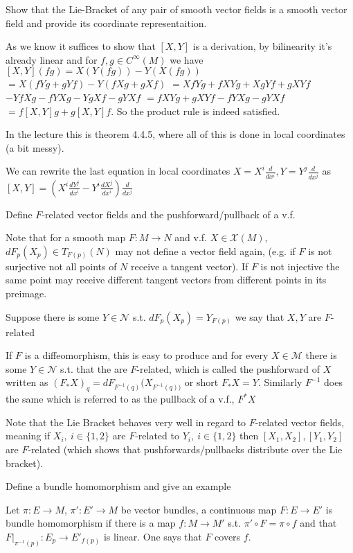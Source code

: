Show that the Lie-Bracket of any pair of smooth vector fields is a smooth vector
field and provide its coordinate representaition.


As we know it suffices to show that \( [X, Y] \) is a derivation, by bilinearity
it's already linear and for \( f, g \in C^\infty(M) \) we have 
\([X, Y](fg) = X (Y (fg)) - Y (X(fg))\)
\(=X(f Yg +gYf)-Y(fXg+gXf)\)
\(=Xf Yg + f XYg + XgYf+gXYf\)
\(-Yf Xg - f YXg -YgXf -gYXf\)
\(= f XYg + gXYf - f YXg - gYXf\)
\(= f [X, Y]g + g[X,Y]f.\)
So the product rule is indeed satisfied.

In the lecture this is theorem 4.4.5,
where all of this is done in local coordinates
(a bit messy).

We can rewrite the last equation in local coordinates 
\( X = X^i \frac{d}{dx^i}, Y = Y^j \frac{d}{dx^j} \) as
\( [X, Y] = (X^i \frac{dY^j}{dx^i} - Y^i \frac{dX^j}{dx^i})\frac{d}{dx^j} \)


Define \( F \)-related vector fields
and the pushforward/pullback of a v.f.

Note that for a smooth map \( F : M \to N \) and v.f. \( X \in \mathcal{X}(M) \), 
\( dF_p(X_p) \in T_{F(p)}(N) \) may not define a vector field again, (e.g. if \( F \)
is not surjective not all points of \( N \) receive a tangent vector).
If \( F \) is not injective the same point may receive different tangent vectors
from different points in its preimage.

Suppose there is some \( Y \in \mathcal{N} \) s.t. \( dF_p(X_p) = Y_{F(p)} \)
we say that \( X,Y \) are \( F \)-related

If \( F \) is a diffeomorphism, this is easy to produce and
for every \( X \in \mathcal{M} \) there is some \( Y \in \mathcal{N} \)
s.t. that the are \( F \)-related, which is called the pushforward of \( X \)
written as \( (F_{\ast}X)_q = dF_{F^{-1}(q)}(X_{F^{-1}(q))} \)
or short \( F_{\ast}X = Y \).
Similarly \( F^{-1} \) does the same
which is referred to as the pullback of a v.f., \( F^\ast X \)

Note that the Lie Bracket behaves very well in regard to \( F \)-related
vector fields, meaning if \( X_i,\ i \in \{1, 2\} \) are \( F \)-related to
\( Y_i,\ i \in \{1, 2\} \) then \( [X_1, X_2], [Y_1, Y_2] \) are \( F \)-related
(which shows that pushforwards/pullbacks distribute over the Lie bracket).


Define a bundle homomorphism and give an example

Let \( \pi : E \to M \), \( \pi' : E' \to M \) be vector bundles,
a continuous map \( F : E \to E' \) is bundle homomorphism if there is
a map \( f : M \to M' \) s.t. \( \pi' \circ F = \pi \circ f \)
and that \( F|_{\pi^{-1}(p)} : E_p \to E'_{f(p)} \) is linear.
One says that \( F \) covers \( f \).

